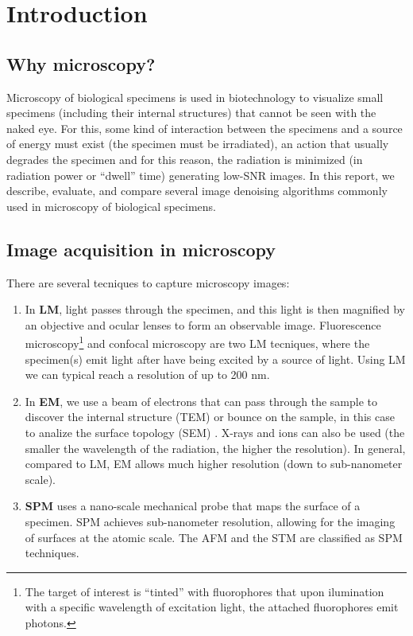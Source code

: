 \chapter{Introduction}

\section{Why microscopy?}
Microscopy of biological specimens is used in biotechnology to
visualize small specimens (including their internal structures) that
cannot be seen with the naked eye. For this, some kind of interaction
between the specimens and a source of energy must exist (the specimen
must be irradiated), an action that usually degrades the specimen and
for this reason, the radiation is minimized (in radiation power or
``dwell'' time) generating low-\gls{SNR} images. In this report, we
describe, evaluate, and compare several image denoising algorithms
commonly used in microscopy of biological specimens.

\section{Image acquisition in microscopy}

There are several tecniques to capture microscopy images:

\begin{enumerate}
\item In \textbf{\gls{LM}}, light passes through the specimen, and this
  light is then magnified by an objective and ocular lenses to form an
  observable image. Fluorescence microscopy\footnote{The target of
  interest is ``tinted'' with fluorophores that upon ilumination with
  a specific wavelength of excitation light, the attached fluorophores
  emit photons.} and confocal microscopy are two \gls{LM} tecniques,
  where the specimen(s) emit light after have being excited by a
  source of light. Using \gls{LM} we can typical reach a resolution of
  up to 200 nm.

\item In \textbf{\gls{EM}}, we use a beam of electrons that can pass
  through the sample to discover the internal structure (\gls{TEM}) or
  bounce on the sample, in this case to analize the surface topology
  (\gls{SEM}) \cite{timischl2012statistical}. X-rays and ions can also
  be used (the smaller the wavelength of the radiation, the higher the
  resolution). In general, compared to \gls{LM}, \gls{EM} allows much
  higher resolution (down to sub-nanometer scale).

\item \textbf{\gls{SPM}} uses a nano-scale mechanical probe that maps
  the surface of a specimen. \gls{SPM} achieves sub-nanometer
  resolution, allowing for the imaging of surfaces at the atomic
  scale. The \gls{AFM} and the \gls{STM} are classified as \gls{SPM}
  techniques.

\end{enumerate}
  
